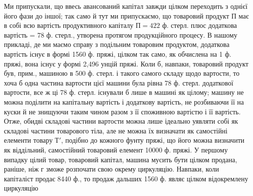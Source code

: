 Ми припускали, що ввесь авансований капітал завжди цілком переходить
з однієї його фази до іншої; так само й тут ми припускаємо, що товаровий
продукт $П$ має в собі всю вартість продуктивного капіталу
$П = 422$ ф. стерл. плюс додаткова вартість = 78 ф. стерл., утворена
протягом продукційного процесу. В нашому прикладі, де ми маємо справу
з подільним товаровим продуктом, додаткова вартість існує в формі
1560 ф. пряжі, цілком так само, як обчислена на 1 ф. пряжі, вона існує
у формі 2,496 унцій пряжі. Коли б, навпаки, товаровий продукт був, прим., машиною
в 500 ф. стерл. і такого самого складу щодо вартости, то хоча б
одна частина вартости цієї машини була рівна 78 ф. стерл. додаткової
вартости, все ж ці 78 ф. стерл. існували б лише в машині як цілому;
машину не можна поділити на капітальну вартість і додаткову вартість,
не розбиваючи її на куски й не знищуючи таким чином разом з її споживною
вартістю і її вартість. Отже, обидві складові частини вартости
можна лише ідеально уявляти собі як складові частини товарового тіла,
але не можна їх визначати як самостійні елементи товару $Т'$, подібно до
кожного фунту пряжі, що його можна визначити як віддільний, самостійний
товаровий елемент 10000 ф. пряжі. У першому випадку цілий товар, товаровий
капітал, машина мусить бути цілком продана, раніше, ніж г зможе розпочати
свою окрему циркуляцію. Навпаки, коли капіталіст продає 8440 ф.,
то продаж дальших 1560 ф. являє цілком відокремлену циркуляцію
\parbreak{}  %

